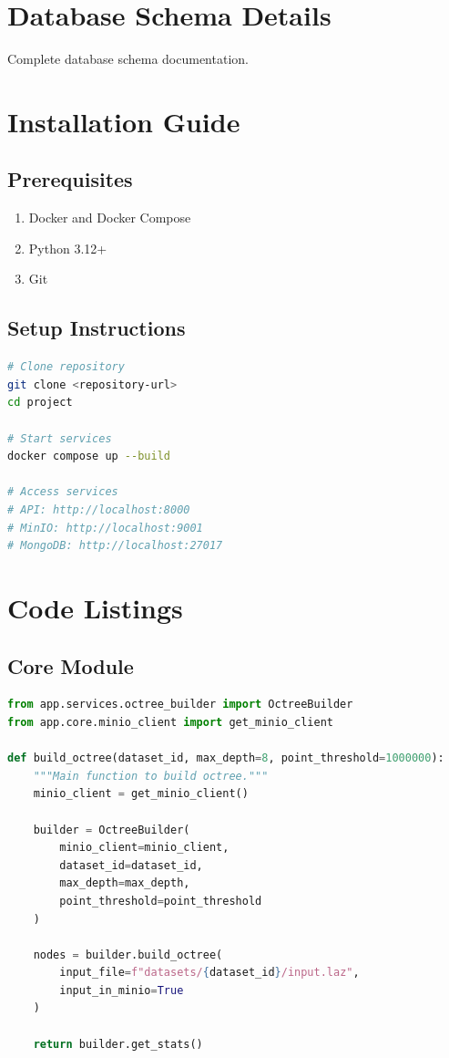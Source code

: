 \documentclass[12pt,a4paper,onecolumn,oneside]{report}
\begin{document}
\chapter{Database Schema Details}
\label{app:schema}

Complete database schema documentation.

\chapter{Installation Guide}
\label{app:installation}

\section{Prerequisites}

\begin{enumerate}
    \item Docker and Docker Compose
    \item Python 3.12+
    \item Git
\end{enumerate}

\section{Setup Instructions}

\begin{lstlisting}[language=bash]
# Clone repository
git clone <repository-url>
cd project

# Start services
docker compose up --build

# Access services
# API: http://localhost:8000
# MinIO: http://localhost:9001
# MongoDB: http://localhost:27017
\end{lstlisting}

\chapter{Code Listings}
\label{app:code}

\section{Core Module}

\begin{lstlisting}[language=Python, caption=Main Octree Builder Module, label=lst:main]
from app.services.octree_builder import OctreeBuilder
from app.core.minio_client import get_minio_client

def build_octree(dataset_id, max_depth=8, point_threshold=1000000):
    """Main function to build octree."""
    minio_client = get_minio_client()
    
    builder = OctreeBuilder(
        minio_client=minio_client,
        dataset_id=dataset_id,
        max_depth=max_depth,
        point_threshold=point_threshold
    )
    
    nodes = builder.build_octree(
        input_file=f"datasets/{dataset_id}/input.laz",
        input_in_minio=True
    )
    
    return builder.get_stats()
\end{lstlisting}
\end{document}
